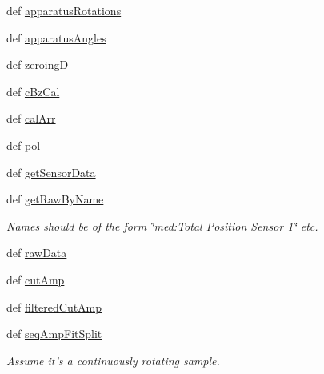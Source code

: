 \begin{DoxyCompactItemize}
\item 
def \hyperlink{classrepo_1_1programs_1_1pythonpackages_1_1pr_1_1SPDataSet_1_1SPDataSet_a7482cde5c58c574e2c1ade31e06fcdb4}{apparatus\-Rotations}
\item 
def \hyperlink{classrepo_1_1programs_1_1pythonpackages_1_1pr_1_1SPDataSet_1_1SPDataSet_aee6249fe272c46f07d0f2f32f6c188d2}{apparatus\-Angles}
\item 
def \hyperlink{classrepo_1_1programs_1_1pythonpackages_1_1pr_1_1SPDataSet_1_1SPDataSet_a6e8c2848a25079fc869ab950445213b8}{zeroing\-D}
\item 
def \hyperlink{classrepo_1_1programs_1_1pythonpackages_1_1pr_1_1SPDataSet_1_1SPDataSet_aa287beda17e46a3969a9321e5904eaed}{c\-Bz\-Cal}
\item 
def \hyperlink{classrepo_1_1programs_1_1pythonpackages_1_1pr_1_1SPDataSet_1_1SPDataSet_af0f40f6c14b1ba1c8de9351a839eb511}{cal\-Arr}
\item 
def \hyperlink{classrepo_1_1programs_1_1pythonpackages_1_1pr_1_1SPDataSet_1_1SPDataSet_a2e98e78e34f1dabc50fa44aa6a96d6f2}{pol}
\item 
def \hyperlink{classrepo_1_1programs_1_1pythonpackages_1_1pr_1_1SPDataSet_1_1SPDataSet_a3a649b10dc80a63cbbb7ed141f90519f}{get\-Sensor\-Data}
\item 
def \hyperlink{classrepo_1_1programs_1_1pythonpackages_1_1pr_1_1SPDataSet_1_1SPDataSet_aa0b687b3c937bfb4aa71c4a09cac5eb5}{get\-Raw\-By\-Name}
\begin{DoxyCompactList}\small\item\em Names should be of the form \char`\"{}med\-:\-Total Position Sensor 1\char`\"{} etc. \end{DoxyCompactList}\item 
def \hyperlink{classrepo_1_1programs_1_1pythonpackages_1_1pr_1_1SPDataSet_1_1SPDataSet_afe54eeb9f41f503dc478557e4ea2c62a}{raw\-Data}
\item 
def \hyperlink{classrepo_1_1programs_1_1pythonpackages_1_1pr_1_1SPDataSet_1_1SPDataSet_a5b12a3d9fdb93ccbf79a6b7a7893be3f}{cut\-Amp}
\item 
def \hyperlink{classrepo_1_1programs_1_1pythonpackages_1_1pr_1_1SPDataSet_1_1SPDataSet_a9eac955cac12a62b72d189aa80b82ec6}{filtered\-Cut\-Amp}
\item 
def \hyperlink{classrepo_1_1programs_1_1pythonpackages_1_1pr_1_1SPDataSet_1_1SPDataSet_a2b09966d9ad35b39ea13988a7c361df6}{seq\-Amp\-Fit\-Split}
\begin{DoxyCompactList}\small\item\em Assume it's a continuously rotating sample. \end{DoxyCompactList}\item 

\end{DoxyCompactItemize}
